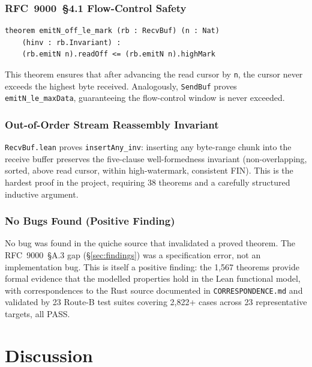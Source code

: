 \documentclass[sigconf,10pt]{acmart}
\begin{document}
\subsubsection{RFC~9000~\S 4.1 Flow-Control Safety}

\begin{lstlisting}
theorem emitN_off_le_mark (rb : RecvBuf) (n : Nat)
    (hinv : rb.Invariant) :
    (rb.emitN n).readOff <= (rb.emitN n).highMark
\end{lstlisting}

This theorem ensures that after advancing the read cursor by \texttt{n},
the cursor never exceeds the highest byte received.
Analogously, \texttt{SendBuf} proves \texttt{emitN\_le\_maxData},
guaranteeing the flow-control window is never exceeded.

\subsubsection{Out-of-Order Stream Reassembly Invariant}

\texttt{RecvBuf.lean} proves \texttt{insertAny\_inv}: inserting any
byte-range chunk into the receive buffer preserves the five-clause
well-formedness invariant (non-overlapping, sorted, above read cursor,
within high-watermark, consistent FIN).
This is the hardest proof in the project, requiring 38 theorems and a
carefully structured inductive argument.

\subsubsection{No Bugs Found (Positive Finding)}

No bug was found in the quiche source that invalidated a proved theorem.
The RFC~9000~\S A.3 gap (\S\ref{sec:findings}) was a
specification error, not an implementation bug.
This is itself a positive finding: the 1{,}567 theorems provide formal
evidence that the modelled properties hold in the Lean functional model,
with correspondences to the Rust source documented in
\texttt{CORRESPONDENCE.md} and validated by 23 Route-B test suites
covering 2{,}822+ cases across 23 representative targets, all PASS.

\section{Discussion}
\label{sec:discussion}
\end{document}
